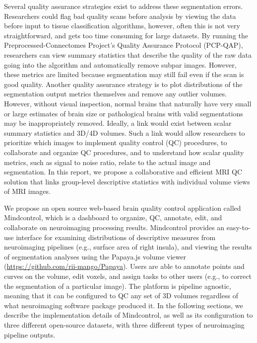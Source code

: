 Several quality assurance strategies exist to address these segmentation errors. Researchers could flag bad quality scans before analysis by viewing the data before input to tissue classification algorithms, however, often this is not very straightforward, and gets too time consuming for large datasets. By running the Preprocessed-Connectomes Project’s Quality Assurance Protocol (PCP-QAP)\cite{shehzadpreprocessed}, researchers can view summary statistics that describe the quality of the raw data going into the algorithm and automatically remove subpar images. However, these metrics are limited because segmentation may still fail even if the scan is good quality. Another quality assurance strategy is to plot distributions of the segmentation output metrics themselves and remove any outlier volumes. However, without visual inspection, normal brains that naturally have very small or large estimates of brain size or pathological brains with valid segmentations may be inappropriately removed. Ideally, a link would exist between scalar summary statistics and 3D/4D volumes. Such a link would allow researchers to prioritize which images to implement quality control (QC) procedures, to collaborate and organize QC procedures, and to understand how scalar quality metrics, such as signal to noise ratio, relate to the actual image and segmentation. In this report, we propose a collaborative and efficient MRI QC solution that links group-level descriptive statistics with individual volume views of MRI images.  

We propose an open source web-based brain quality control application called Mindcontrol, which is a dashboard to organize, QC, annotate, edit, and collaborate on neuroimaging processing results. Mindcontrol provides an easy-to-use interface for examining distributions of descriptive measures from neuroimaging pipelines (e.g., surface area of right insula), and viewing the results of segmentation analyses using the Papaya.js volume viewer (\href{https://github.com/rii-mango/Papaya}{https://github.com/rii-mango/Papaya}). Users are able to annotate points and curves on the volume, edit voxels, and assign tasks to other users (e.g., to correct the segmentation of a particular image). The platform is pipeline agnostic, meaning that it can be configured to QC any set of 3D volumes regardless of what neuroimaging software package produced it. In the following sections, we describe the implementation details of Mindcontrol, as well as its configuration to three different open-source datasets, with three different types of neuroimaging pipeline outputs. 

